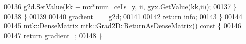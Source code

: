 \begin{DoxyCode}
00136       g2d.\hyperlink{classmtk_1_1DenseMatrix_a784ce5784109ac86bfb9d8562b334b13}{SetValue}(kk + mx*num\_cells\_y, ii, gyx.\hyperlink{classmtk_1_1DenseMatrix_a4b23ecbebd970b5eea915dbb50691024}{GetValue}(kk,ii));
00137     \}
00138   \}
00139 
00140   gradient\_ = g2d;
00141 
00142   \textcolor{keywordflow}{return} info;
00143 \}
00144 
\hypertarget{mtk__grad__2d_8cc_source_l00145}{}\hyperlink{classmtk_1_1Grad2D_a4f5a17519455f833bb70b8434c272312}{00145} \hyperlink{classmtk_1_1DenseMatrix}{mtk::DenseMatrix} \hyperlink{classmtk_1_1Grad2D_a4f5a17519455f833bb70b8434c272312}{mtk::Grad2D::ReturnAsDenseMatrix}()\textcolor{keyword}{ const }\{
00146 
00147   \textcolor{keywordflow}{return} gradient\_;
00148 \}
\end{DoxyCode}
